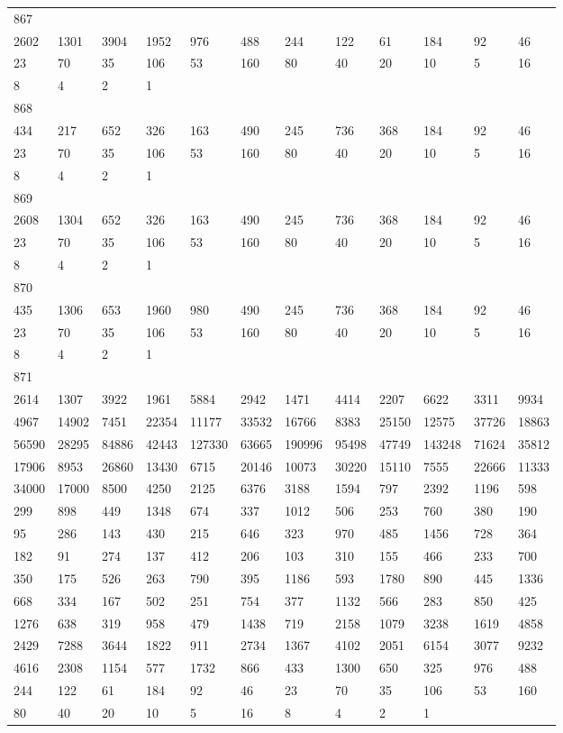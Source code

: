 \begin{longtable}{llllllllllll}
867&&&&&&&&&&&\\
2602& 1301& 3904& 1952& 976& 488& 244& 122& 61& 184& 92& 46\\
23& 70& 35& 106& 53& 160& 80& 40& 20& 10& 5& 16\\
8& 4& 2& 1& \\

868&&&&&&&&&&&\\
434& 217& 652& 326& 163& 490& 245& 736& 368& 184& 92& 46\\
23& 70& 35& 106& 53& 160& 80& 40& 20& 10& 5& 16\\
8& 4& 2& 1& \\

869&&&&&&&&&&&\\
2608& 1304& 652& 326& 163& 490& 245& 736& 368& 184& 92& 46\\
23& 70& 35& 106& 53& 160& 80& 40& 20& 10& 5& 16\\
8& 4& 2& 1& \\

870&&&&&&&&&&&\\
435& 1306& 653& 1960& 980& 490& 245& 736& 368& 184& 92& 46\\
23& 70& 35& 106& 53& 160& 80& 40& 20& 10& 5& 16\\
8& 4& 2& 1& \\

871&&&&&&&&&&&\\
2614& 1307& 3922& 1961& 5884& 2942& 1471& 4414& 2207& 6622& 3311& 9934\\
4967& 14902& 7451& 22354& 11177& 33532& 16766& 8383& 25150& 12575& 37726& 18863\\
56590& 28295& 84886& 42443& 127330& 63665& 190996& 95498& 47749& 143248& 71624& 35812\\
17906& 8953& 26860& 13430& 6715& 20146& 10073& 30220& 15110& 7555& 22666& 11333\\
34000& 17000& 8500& 4250& 2125& 6376& 3188& 1594& 797& 2392& 1196& 598\\
299& 898& 449& 1348& 674& 337& 1012& 506& 253& 760& 380& 190\\
95& 286& 143& 430& 215& 646& 323& 970& 485& 1456& 728& 364\\
182& 91& 274& 137& 412& 206& 103& 310& 155& 466& 233& 700\\
350& 175& 526& 263& 790& 395& 1186& 593& 1780& 890& 445& 1336\\
668& 334& 167& 502& 251& 754& 377& 1132& 566& 283& 850& 425\\
1276& 638& 319& 958& 479& 1438& 719& 2158& 1079& 3238& 1619& 4858\\
2429& 7288& 3644& 1822& 911& 2734& 1367& 4102& 2051& 6154& 3077& 9232\\
4616& 2308& 1154& 577& 1732& 866& 433& 1300& 650& 325& 976& 488\\
244& 122& 61& 184& 92& 46& 23& 70& 35& 106& 53& 160\\
80& 40& 20& 10& 5& 16& 8& 4& 2& 1& \\


\end{longtable}
